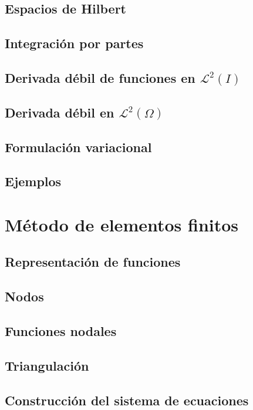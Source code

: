 \documentclass[12pt,spanish,oneside]{book}
\theoremstyle{plain}
\numberwithin{equation}{chapter}
\theoremstyle{definition}
\theoremstyle{remark}
\newcommand{\LD}{\mathcal{L}^2}
\begin{document}
\section{Espacios de Hilbert}

\section{Integración por partes}

\section{Derivada débil de funciones en $\LD(I)$}

\section{Derivada débil en $\LD(\Omega)$}


\section{Formulación variacional}

\section{Ejemplos}

\chapter{Método de elementos finitos}
\section{Representación de funciones}

\section{Nodos}\label{CapNodos}


\section{Funciones nodales}\label{Sfn}

\section{Triangulación} \label{Triangulacion}

\section{Construcción del sistema de ecuaciones}
\end{document}
